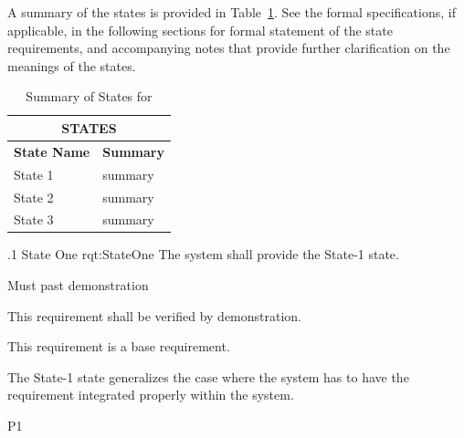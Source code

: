 A summary of the states is provided in Table~\ref{tab:States}.
See the formal specifications, if applicable, in the following sections for formal statement of the state requirements, and accompanying notes that provide further clarification on the meanings of the states.

\begin{table}[h]
	\begin{center}
		\begin{tabular}{|p{1.0in}|p{5.0in}|}
			\hline
			\hline
			\multicolumn{2}{|c|}{{\bf STATES}} \\
			\hline
				{\bf State Name} & {\bf Summary} \\
			\hline
			\hline
State 1 & summary \\ \hline
State 2 & summary \\ \hline
State 3 & summary \\ 
			\hline
			\hline
		\end{tabular}
		\caption{Summary of States for \ThisSystem}
		\label{tab:States}
	\end{center}
\end{table}


\ONERQMTV
{\RqtNumberBase.1}
{State One}
{rqt:StateOne}
{The system shall provide the State-1 state.}
{
	\item [Phase 1] Must past demonstration
}
{This requirement shall be verified by demonstration.}
{
	\item [N/A] This requirement is a base requirement.
}
{
	\item The State-1 state generalizes the case where the system has to have the requirement integrated properly within the system.
}
{P1}


